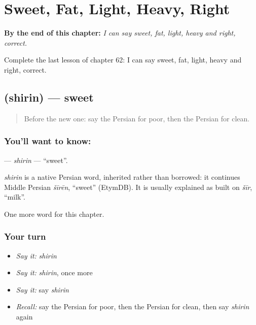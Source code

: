 
\chapter{Sweet, Fat, Light, Heavy, Right}
\label{ch:fa-sweet-fat-light-heavy-right}

\begin{chapteropening}
\textbf{By the end of this chapter:} \emph{I can say sweet, fat, light, heavy and right, correct.}

Complete the last lesson of chapter 62: I can say sweet, fat, light, heavy and right, correct.
\end{chapteropening}

\section[\texorpdfstring{\fa{شیرین} (shirin)}{شیرین (shirin)}]{ (shirin) — sweet}

\label{lesson:FA-C62-shirin}



\begin{quote}
Before the new one: say the Persian for poor, then the Persian for clean.
\end{quote}

\subsection*{You'll want to know: }
\textbf{} — \emph{shirin} — \textquotedblleft{}sweet\textquotedblright{}.

\begin{cousinweb}
\emph{shirin} is a native Persian word, inherited rather than borrowed: it continues Middle Persian \emph{šīrēn}, \textquotedblleft{}sweet\textquotedblright{} (EtymDB). It is usually explained as built on \emph{šīr}, \textquotedblleft{}milk\textquotedblright{}.
\end{cousinweb}

\begin{grammarlens}[title={What you've built}]
One more word for this chapter.
\end{grammarlens}

\subsection*{Your turn}
\begin{itemize}
\raggedright
  \item \emph{Say it:} \emph{shirin}
  \item \emph{Say it:} \emph{shirin}, once more
  \item \emph{Say it:} say \emph{shirin}
  \item \emph{Recall:} say the Persian for poor, then the Persian for clean, then say \emph{shirin} again
\end{itemize}

